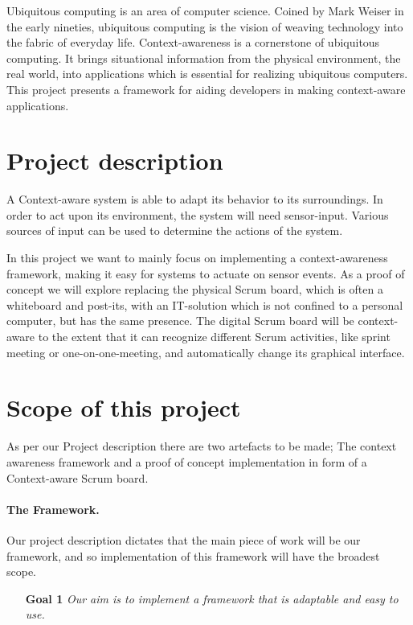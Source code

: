 \documentclass[../report.tex]{subfiles}
\begin{document}
\graphicspath{{img/}{../img/}}
Ubiquitous computing is an area of computer science. Coined by Mark Weiser in the early nineties, ubiquitous computing is the vision of weaving technology into the fabric of everyday life. Context-awareness is a cornerstone of ubiquitous computing. It brings situational information from the physical environment, the real world, into applications which is essential for realizing ubiquitous computers. This project presents a framework for aiding developers in making context-aware applications.

\section{Project description}
A Context-aware system is able to adapt its behavior to its surroundings. In order to act upon its environment, the system will need sensor-input. Various sources of input can be used to determine the actions of the system.

In this project we want to mainly focus on implementing a context-awareness framework, making it easy for systems to actuate on sensor events. As a proof of concept we will explore replacing the physical Scrum board, which is often a whiteboard and post-its, with an IT-solution which is not confined to a personal computer, but has the same presence. The digital Scrum board will be context-aware to the extent that it can recognize different Scrum activities, like sprint meeting or one-on-one-meeting, and automatically change its graphical interface.


\section{Scope of this project}
\label{scope}

As per our Project description there are two artefacts to be made; The context awareness framework and a proof of concept implementation in form of a Context-aware Scrum board.

\paragraph{The Framework.} 
Our project description dictates that the main piece of work will be our framework, and so implementation of this framework will have the broadest scope.\\

\begin{itemize}
\item[\textbf{Goal 1}] \textit{Our aim is to implement a framework that is adaptable and easy to use.}
\end{itemize}
\end{document}
